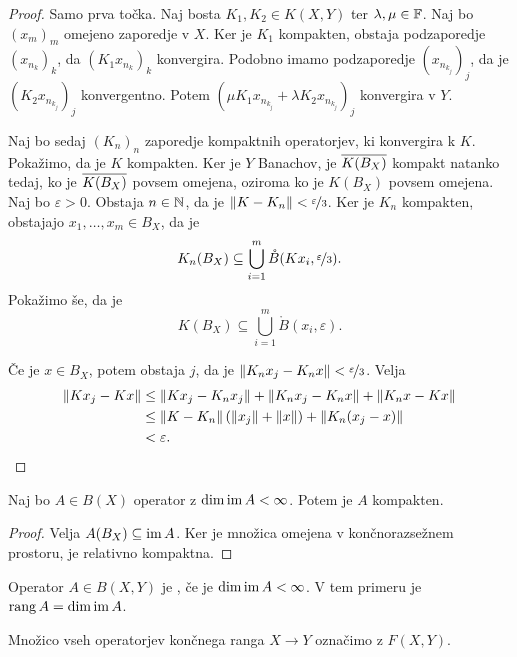 \begin{proof}
  Samo prva točka.
  Naj bosta $K_1, K_2 \in K(X,Y)$ ter $\lambda, \mu \in \mathbb{F}$.
  Naj bo $(x_m)_m$ omejeno zaporedje v $X$.
  Ker je $K_1$ kompakten, obstaja podzaporedje $(x_{n_k})_k$, da $(K_1
  x_{n_k})_k$ konvergira.
  Podobno imamo podzaporedje $(x_{n_{k_j}})_j$, da je $(K_2 x_{n_{k_j}})_j$
  konvergentno.
  Potem $(\mu K_1 x_{n_{k_j}} + \lambda K_2 x_{n_{k_j}})_j$ konvergira v $Y$.

  Naj bo sedaj $(K_n)_n$ zaporedje kompaktnih operatorjev, ki konvergira k $K$.
  Pokažimo, da je $K$ kompakten.
  Ker je $Y$ Banachov, je $\overline{K(B_X)}$ kompakt natanko tedaj, ko je
  $\overline{K(B_X)}$ povsem omejena, oziroma ko je $K(B_X)$ povsem omejena.
  Naj bo $\varepsilon > 0$.
  Obstaja $n \in \mathbb{N}$, da je $\left\lVert K - K_n\right\rVert < \nicefrac{\varepsilon}{3}$.
  Ker je $K_n$ kompakten, obstajajo $x_1, \ldots, x_m \in B_X$, da je
  \[
	K_n(B_X) \subseteq \bigcup_{i=1}^m \mathring{B}(Kx_i,
	\nicefrac{\varepsilon}{3}).
  \]
  Pokažimo še, da je
  \[
	K(B_X) \subseteq \bigcup_{i=1}^m \mathring{B}(x_i, \varepsilon).
  \]

  Če je $x \in B_X$, potem obstaja $j$, da je $\left\lVert K_n x_j - K_n x\right\rVert <
  \nicefrac{\varepsilon}{3}$.
  Velja
  \begin{align*}
	\left\lVert K x_j - K x\right\rVert
	&\le \left\lVert K x_j - K_n x_j\right\rVert + \left\lVert K_n x_j - K_n x\right\rVert + \left\lVert K_n x - Kx\right\rVert \\
	&\le \left\lVert K - K_n\right\rVert (\left\lVert x_j\right\rVert + \left\lVert x\right\rVert) + \left\lVert K_n(x_j - x)\right\rVert \\
	&< \varepsilon.
	  \qedhere
  \end{align*}
\end{proof}

\begin{trditev}
  Naj bo $A \in B(X)$ operator z $\dim \operatorname{im} A < \infty$.
  Potem je $A$ kompakten.
\end{trditev}

\begin{proof}
  Velja $A(B_X) \subseteq \operatorname{im} A$.
  Ker je množica omejena v končnorazsežnem prostoru, je relativno kompaktna.
\end{proof}

\begin{definicija}
  Operator $A \in B(X,Y)$ je , če je $\dim \operatorname{im} A <
  \infty$.
  V tem primeru je $\operatorname{rang} A = \dim \operatorname{im} A$.
\end{definicija}

\begin{definicija}
  Množico vseh operatorjev končnega ranga $X \to Y$ označimo z $F(X,Y)$.
\end{definicija}

